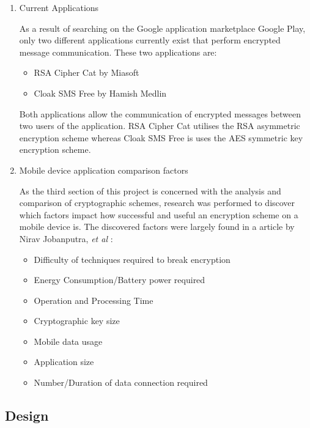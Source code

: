 \documentclass[a4paper,11pt]{article}
\begin{document}
\begin{enumerate}
  \item
  \begin{description}
    \item[Current Applications] 
  \end{description}
  As a result of searching on the Google application marketplace Google Play, only two different applications currently exist that perform encrypted message communication. These two applications are:
  \begin{itemize}
    \item RSA Cipher Cat by Miasoft \cite{rsaciphercat}
    \item Cloak SMS Free by Hamish Medlin \cite{cloacksms}
  \end{itemize}
  Both applications allow the communication of encrypted messages between two users of the application. RSA Cipher Cat utilises the RSA asymmetric encryption scheme whereas Cloak SMS Free is uses the AES symmetric key encryption scheme.
  \item
  \begin{description}
    \item[Mobile device application comparison factors] 
  \end{description}
  As the third section of this project is concerned with the analysis and comparison of cryptographic schemes, research was performed to discover which factors impact how successful and useful an encryption scheme on a mobile device is. The discovered factors were largely found in a article by Nirav Jobanputra, \textit{et al} \cite{ejeta}:
  \begin{itemize}
    \item Difficulty of techniques required to break encryption
    \item Energy Consumption/Battery power required
    \item Operation and Processing Time
    \item Cryptographic key size
    \item Mobile data usage
    \item Application size
    \item Number/Duration of data connection required
  \end{itemize}
\end{enumerate}

\subsection{Design}
\end{document}
